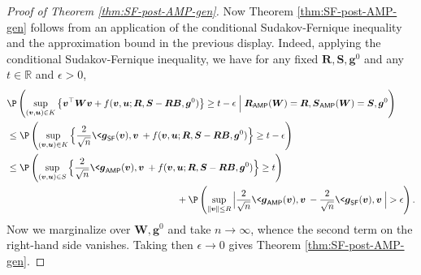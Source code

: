 \documentclass[]{article}
\def\bR{{\boldsymbol R}}
\def\bW{{\boldsymbol W}}
\def\bv{{\boldsymbol V}}
\def\bS{\boldsymbol{S}}
\def\bB{{\boldsymbol B}}
\def\bu{{\boldsymbol u}}
\def\bg{{\boldsymbol g}}
\def\bv{{\boldsymbol v}}
\def\reals{{\mathbb R}}
\def\bW{{\boldsymbol W}}
\def\bv{{\boldsymbol v}}
\def\bu{{\boldsymbol u}}
\def\bg{{\boldsymbol g}}
\def\AMP{\mathsf{AMP}}
\def\SF{\mathsf{SF}}
\begin{document}
\begin{proof}[Proof of Theorem \ref{thm:SF-post-AMP-gen}]
    Now Theorem \ref{thm:SF-post-AMP-gen} follows from an application of the conditional Sudakov-Fernique inequality and the approximation bound in the previous display.
    Indeed,
    applying the conditional Sudakov-Fernique inequality, 
    we have for any fixed $\bR,\bS,\bg^0$ and any $t \in \reals$ and $\epsilon > 0$,
    \begin{equation}
    \begin{aligned}
        &\P\left(
            \sup_{(\bv,\bu) \in K} \big\{ \bv^\top \bW \bv + f(\bv,\bu; \bR,\bS - \bR \bB,\bg^0) \big\} \geq t -\epsilon
            \Bigm|
            \bR_{\AMP}(\bW) = \bR, \bS_{\AMP}(\bW) = \bS, \bg^0
        \right)
    \\
        &\leq 
        \P\left(
            \sup_{(\bv,\bu) \in K} \Big\{ \frac2{\sqrt{n}}\< \bg_{\SF}(\bv),\bv\> + f(\bv,\bu;\bR,\bS - \bR \bB,\bg^0) \Big\} \geq t -\epsilon
        \right)
    \\
        &\leq 
            \P\left(
                \sup_{(\bv,\bu) \in S} \Big\{ \frac2{\sqrt{n}}\< \bg_{\AMP}(\bv),\bv\> + f(\bv,\bu;\bR,\bS - \bR \bB,\bg^0) \Big\} \geq t
            \right)
    \\
        &\qquad\qquad\qquad\qquad\qquad\qquad\qquad\qquad\qquad+
            \P\left(
                \sup_{\| \bv \| \leq R}
                \Big|
                    \frac2{\sqrt{n}} \< \bg_{\AMP}(\bv) , \bv \>
                    -
                    \frac2{\sqrt{n}} \< \bg_{\SF} (\bv) , \bv \>
                \Big|
                > \epsilon
            \right).
    \end{aligned}
    \end{equation}
    Now we marginalize over $\bW,\bg^0$ and
    take $n \rightarrow \infty$,
    whence the second term on the right-hand side vanishes.
    Taking then $\epsilon \rightarrow 0$ gives Theorem \ref{thm:SF-post-AMP-gen}.
\end{proof}
\end{document}
